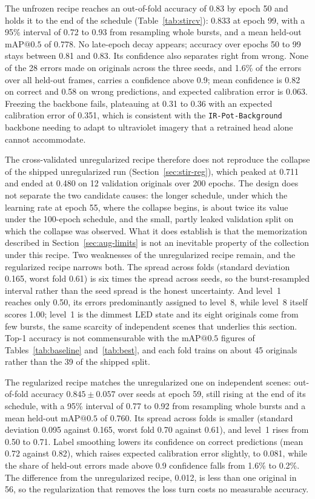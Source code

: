 ﻿\documentclass[journal]{IEEEtran}
\begin{document}
The unfrozen recipe reaches an out-of-fold accuracy of 0.83 by epoch 50 and holds it to the end of the schedule (Table~\ref{tab:stircv}): 0.833 at epoch 99, with a 95\% interval of 0.72 to 0.93 from resampling whole bursts, and a mean held-out $\text{mAP@0.5}$ of 0.778. No late-epoch decay appears; accuracy over epochs 50 to 99 stays between 0.81 and 0.83. Its confidence also separates right from wrong. None of the 28 errors made on originals across the three seeds, and 1.6\% of the errors over all held-out frames, carries a confidence above 0.9; mean confidence is 0.82 on correct and 0.58 on wrong predictions, and expected calibration error is 0.063. Freezing the backbone fails, plateauing at 0.31 to 0.36 with an expected calibration error of 0.351, which is consistent with the \texttt{IR-Pot-Background} backbone needing to adapt to ultraviolet imagery that a retrained head alone cannot accommodate.

The cross-validated unregularized recipe therefore does not reproduce the collapse of the shipped unregularized run (Section~\ref{sec:stir-reg}), which peaked at 0.711 and ended at 0.480 on 12 validation originals over 200 epochs. The design does not separate the two candidate causes: the longer schedule, under which the learning rate at epoch 55, where the collapse begins, is about twice its value under the 100-epoch schedule, and the small, partly leaked validation split on which the collapse was observed. What it does establish is that the memorization described in Section~\ref{sec:aug-limits} is not an inevitable property of the collection under this recipe. Two weaknesses of the unregularized recipe remain, and the regularized recipe narrows both. The spread across folds (standard deviation 0.165, worst fold 0.61) is six times the spread across seeds, so the burst-resampled interval rather than the seed spread is the honest uncertainty. And level~1 reaches only 0.50, its errors predominantly assigned to level~8, while level~8 itself scores 1.00; level~1 is the dimmest LED state and its eight originals come from few bursts, the same scarcity of independent scenes that underlies this section. Top-1 accuracy is not commensurable with the $\text{mAP@0.5}$ figures of Tables~\ref{tab:baseline} and~\ref{tab:best}, and each fold trains on about 45 originals rather than the 39 of the shipped split.

The regularized recipe matches the unregularized one on independent scenes: out-of-fold accuracy $0.845 \pm 0.057$ over seeds at epoch 59, still rising at the end of its schedule, with a 95\% interval of 0.77 to 0.92 from resampling whole bursts and a mean held-out $\text{mAP@0.5}$ of 0.760. Its spread across folds is smaller (standard deviation 0.095 against 0.165, worst fold 0.70 against 0.61), and level~1 rises from 0.50 to 0.71. Label smoothing lowers its confidence on correct predictions (mean 0.72 against 0.82), which raises expected calibration error slightly, to 0.081, while the share of held-out errors made above 0.9 confidence falls from 1.6\% to 0.2\%. The difference from the unregularized recipe, 0.012, is less than one original in 56, so the regularization that removes the loss turn costs no measurable accuracy.
\end{document}
